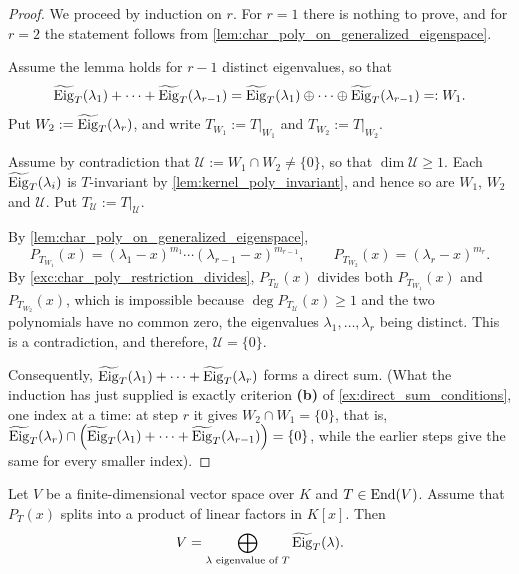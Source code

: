 \begin{proof}
We proceed by induction on $r$. For $r = 1$ there is nothing to prove, and for $r = 2$ the statement follows from \cref{lem:char_poly_on_generalized_eigenspace}.

Assume the lemma holds for $r-1$ distinct eigenvalues, so that
\[
    \widetilde{\operatorname{Eig}}_T(\lambda_1) + \dots + \widetilde{\operatorname{Eig}}_T(\lambda_{r-1}) = \widetilde{\operatorname{Eig}}_T(\lambda_1) \oplus \dots \oplus \widetilde{\operatorname{Eig}}_T(\lambda_{r-1}) =: W_1.
\]
Put $W_2 := \widetilde{\operatorname{Eig}}_T(\lambda_r)$, and write $T_{W_1} := T|_{W_1}$ and $T_{W_2} := T|_{W_2}$.

Assume by contradiction that $\mathcal{U} := W_1 \cap W_2 \neq \{0\}$, so that $\dim \mathcal{U} \ge 1$. Each $\widetilde{\operatorname{Eig}}_T(\lambda_i)$ is $T$-invariant by \cref{lem:kernel_poly_invariant}, and hence so are $W_1$, $W_2$ and $\mathcal{U}$. Put $T_{\mathcal{U}} := T|_{\mathcal{U}}$.

By \cref{lem:char_poly_on_generalized_eigenspace},
\[
    P_{T_{W_1}}(x) = (\lambda_1 - x)^{m_1} \cdots (\lambda_{r-1} - x)^{m_{r-1}}, \qquad P_{T_{W_2}}(x) = (\lambda_r - x)^{m_r}.
\]
By \cref{exc:char_poly_restriction_divides}, $P_{T_{\mathcal{U}}}(x)$ divides both $P_{T_{W_1}}(x)$ and $P_{T_{W_2}}(x)$, which is impossible because $\deg P_{T_{\mathcal{U}}}(x) \ge 1$ and the two polynomials have no common zero, the eigenvalues $\lambda_1, \dots, \lambda_r$ being distinct. This is a contradiction, and therefore, $\mathcal{U} = \{0\}$.

Consequently, $\widetilde{\operatorname{Eig}}_T(\lambda_1) + \dots + \widetilde{\operatorname{Eig}}_T(\lambda_r)$ forms a direct sum. (What the induction has just supplied is exactly criterion \textbf{(b)} of \cref{ex:direct_sum_conditions}, one index at a time: at step $r$ it gives $W_2 \cap W_1 = \{0\}$, that is, $\widetilde{\operatorname{Eig}}_T(\lambda_r) \cap \left(\widetilde{\operatorname{Eig}}_T(\lambda_1) + \dots + \widetilde{\operatorname{Eig}}_T(\lambda_{r-1})\right) = \{0\}$, while the earlier steps give the same for every smaller index).
\end{proof}

\begin{proposition}
\label{prop:decomposition_generalized_eigenspaces}
Let $V$ be a finite-di\-men\-sional vector space over $K$ and $T \in \operatorname{End}(V)$. Assume that $P_T(x)$ splits into a product of linear factors in $K[x]$. Then
\[
    V = \bigoplus_{\lambda \text{ eigenvalue of } T} \widetilde{\operatorname{Eig}}_T(\lambda).
\]
\end{proposition}

